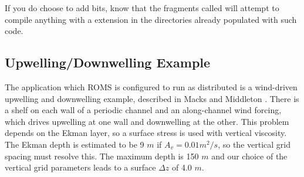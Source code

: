 If you do choose to add bits, know that the 
fragments called  will attempt to compile anything
with a  extension in the directories already populated with
such code.

\subsection{Upwelling/Downwelling Example}
\label{UpDown}
The application which ROMS is configured to run as distributed
is a wind-driven
upwelling and downwelling example, described in Macks and Middleton
\cite{Macks93}.  There is a shelf on each wall of a periodic channel
and an along-channel wind forcing, which drives upwelling at one wall
and downwelling at the other.  This problem depends on the Ekman layer,
so a surface stress is used with vertical viscosity.  The Ekman depth
is estimated to be 9 $m$ if $A_v = 0.01 m^2 / s$, so the vertical grid
spacing must resolve this.  The maximum depth is 150 $m$ and our choice
of the vertical grid parameters leads to a surface $\Delta z$ of 4.0
$m$.

